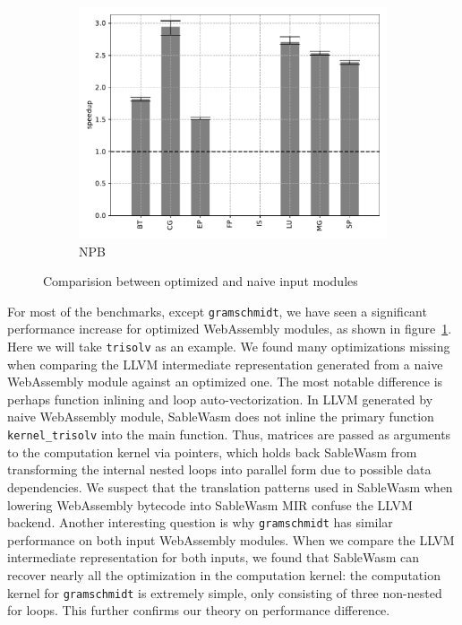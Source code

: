 \begin{figure}
\begin{subfigure}[t]{.45\textwidth}
        \includegraphics[width=\textwidth]{Images/6.2.RQ2/npb-opt-speedup}
        \caption{NPB}
    \end{subfigure}
    \caption{Comparision between optimized and naive input modules}
    \label{fig:rq2}
\end{figure}

For most of the benchmarks, except \texttt{gramschmidt}, we have seen a
significant performance increase for optimized WebAssembly modules, as shown
in figure~\ref{fig:rq2}. Here we will take \texttt{trisolv} as an example. We
found many optimizations missing when comparing the LLVM intermediate
representation generated from a naive WebAssembly module against an optimized
one. The most notable difference is perhaps function inlining and loop
auto-vectorization. In LLVM generated by naive WebAssembly module, SableWasm
does not inline the primary function \texttt{kernel\_trisolv} into the main
function. Thus, matrices are passed as arguments to the computation kernel via
pointers, which holds back SableWasm from transforming the internal nested
loops into parallel form due to possible data dependencies. We suspect that the
translation patterns used in SableWasm when lowering WebAssembly bytecode into
SableWasm MIR confuse the LLVM backend. Another interesting question is why
\texttt{gramschmidt} has similar performance on both input WebAssembly modules.
When we compare the LLVM intermediate representation for both inputs, we found
that SableWasm can recover nearly all the optimization in the computation
kernel: the computation kernel for \texttt{gramschmidt} is extremely simple,
only consisting of three non-nested for loops. This further confirms our theory
on performance difference.

